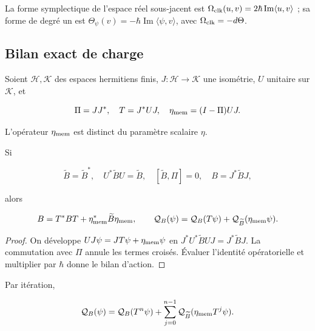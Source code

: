 La forme symplectique de l’espace réel sous-jacent est
\(\Omega_{\rm clk}(u,v)=2\hbar\operatorname{Im}\langle u,v\rangle\) ;
sa forme de degré un est
\(\Theta_\psi(v)=-\hbar\operatorname{Im}\langle\psi,v\rangle\),
avec \(\Omega_{\rm clk}=-d\Theta\).

\subsection{Bilan exact de charge}

Soient \(\mathcal H,\mathcal K\) des espaces hermitiens finis, \(J:\mathcal H\to\mathcal K\) une isométrie, \(U\) unitaire sur \(\mathcal K\), et

\begin{equation}
\Pi=JJ^*,\quad T=J^*UJ,\quad
\eta_{\rm mem}=(I-\Pi)UJ.
\label{x_reciprocidad:nuc07:eq:15}
\end{equation}

L’opérateur \(\eta_{\rm mem}\) est distinct du paramètre scalaire \(\eta\).

\begin{proposition}
Si

\begin{equation}
\widetilde B=\widetilde B^*,\quad U^*\widetilde BU=\widetilde B,
\quad [\widetilde B,\Pi]=0,\quad B=J^*\widetilde BJ,
\label{x_reciprocidad:nuc07:eq:16}
\end{equation}

alors

\begin{equation}
B=T^*BT+\eta_{\rm mem}^*\widetilde B\eta_{\rm mem},
\qquad
\mathcal Q_B(\psi)=
\mathcal Q_B(T\psi)+\mathcal Q_{\widetilde B}(\eta_{\rm mem}\psi).
\label{x_reciprocidad:nuc07:eq:17}
\end{equation}
\end{proposition}

\begin{proof}
On développe \(UJ\psi=JT\psi+\eta_{\rm mem}\psi\) en
\(J^*U^*\widetilde BUJ=J^*\widetilde BJ\).
La commutation avec \(\Pi\) annule les termes croisés. Évaluer l’identité opératorielle et multiplier par \(\hbar\) donne le bilan d’action.
\end{proof}

Par itération,

\begin{equation}
\mathcal Q_B(\psi)=\mathcal Q_B(T^n\psi)
+\sum_{j=0}^{n-1}\mathcal Q_{\widetilde B}
(\eta_{\rm mem}T^j\psi).
\label{x_reciprocidad:nuc07:eq:18}
\end{equation}

